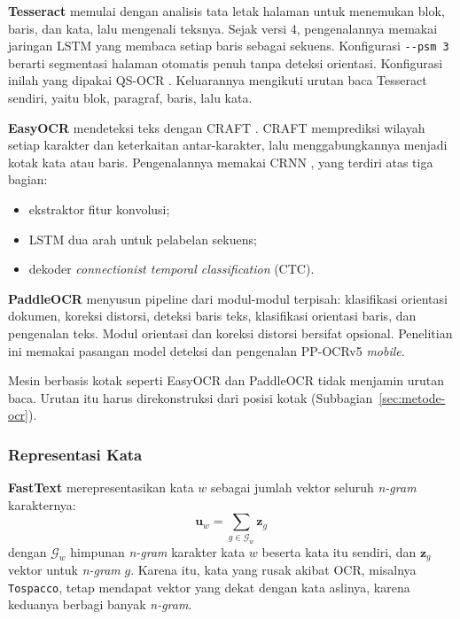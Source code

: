 \textbf{Tesseract} \parencite{smith2007} memulai dengan analisis tata letak halaman untuk
menemukan blok, baris, dan kata, lalu mengenali teksnya. Sejak versi 4, pengenalannya
memakai jaringan LSTM yang membaca setiap baris sebagai sekuens. Konfigurasi
\texttt{-{}-psm 3} berarti segmentasi halaman otomatis penuh tanpa deteksi orientasi.
Konfigurasi inilah yang dipakai QS-OCR \parencite{qsocr}. Keluarannya mengikuti urutan baca
Tesseract sendiri, yaitu blok, paragraf, baris, lalu kata.

\textbf{EasyOCR} \parencite{easyocr} mendeteksi teks dengan CRAFT \parencite{baek2019}. CRAFT
memprediksi wilayah setiap karakter dan keterkaitan antar-karakter, lalu menggabungkannya
menjadi kotak kata atau baris. Pengenalannya memakai CRNN \parencite{shi2017}, yang terdiri
atas tiga bagian:
\begin{itemize}
  \item ekstraktor fitur konvolusi;
  \item LSTM dua arah untuk pelabelan sekuens;
  \item dekoder \textit{connectionist temporal classification} (CTC).
\end{itemize}

\textbf{PaddleOCR} \parencite{paddleocr} menyusun pipeline dari modul-modul terpisah:
klasifikasi orientasi dokumen, koreksi distorsi, deteksi baris teks, klasifikasi
orientasi baris, dan pengenalan teks. Modul orientasi dan koreksi distorsi bersifat
opsional. Penelitian ini memakai pasangan model deteksi dan pengenalan PP-OCRv5
\textit{mobile}.

Mesin berbasis kotak seperti EasyOCR dan PaddleOCR tidak menjamin urutan baca. Urutan
itu harus direkonstruksi dari posisi kotak (Subbagian~\ref{sec:metode-ocr}).

\subsubsection{Representasi Kata}

\textbf{FastText} \parencite{bojanowski2017} merepresentasikan kata $w$ sebagai jumlah
vektor seluruh \textit{n-gram} karakternya:
\begin{equation}\label{eq:fasttext}
  \mathbf{u}_w = \sum_{g \in \mathcal{G}_w} \mathbf{z}_g
\end{equation}
dengan $\mathcal{G}_w$ himpunan \textit{n-gram} karakter kata $w$ beserta kata itu
sendiri, dan $\mathbf{z}_g$ vektor untuk \textit{n-gram} $g$. Karena itu, kata yang rusak
akibat OCR, misalnya \texttt{Tospacco}, tetap mendapat vektor yang dekat dengan kata
aslinya, karena keduanya berbagi banyak \textit{n-gram}.

